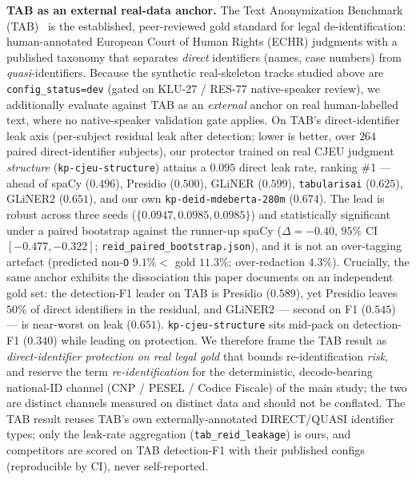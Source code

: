 \documentclass[11pt]{article}
\begin{document}
\textbf{TAB as an external real-data anchor.} The Text Anonymization Benchmark
(TAB)~\cite{pilan2022tab} is the established, peer-reviewed gold standard for legal de-identification:
human-annotated European Court of Human Rights (ECHR) judgments with a published taxonomy that
separates \emph{direct} identifiers (names, case numbers) from \emph{quasi}-identifiers. Because the
synthetic real-skeleton tracks studied above are \texttt{config\_status=dev} (gated on KLU-27 /
RES-77 native-speaker review), we additionally evaluate against TAB as an \emph{external} anchor on
real human-labelled text, where no native-speaker validation gate applies. On TAB's
direct-identifier leak axis (per-subject residual leak after detection; lower is better, over $264$
paired direct-identifier subjects), our protector trained on real CJEU judgment \emph{structure}
(\texttt{kp-cjeu-structure}) attains a $0.095$ direct leak rate, ranking \#1 --- ahead of spaCy
($0.496$), Presidio ($0.500$), GLiNER ($0.599$), \texttt{tabularisai} ($0.625$), GLiNER2 ($0.651$),
and our own \texttt{kp-deid-mdeberta-280m} ($0.674$). The lead is robust across three seeds
($\{0.0947, 0.0985, 0.0985\}$) and statistically significant under a paired bootstrap against the
runner-up spaCy ($\Delta = -0.40$, $95\%$ CI $[-0.477, -0.322]$;
\texttt{reid\_paired\_bootstrap.json}), and it is not an over-tagging artefact (predicted non-\texttt{O}
$9.1\% < $ gold $11.3\%$; over-redaction $4.3\%$). Crucially, the same anchor exhibits the
dissociation this paper documents on an independent gold set: the detection-F1 leader on TAB is
Presidio ($0.589$), yet Presidio leaves $50\%$ of direct identifiers in the residual, and GLiNER2 ---
second on F1 ($0.545$) --- is near-worst on leak ($0.651$). \texttt{kp-cjeu-structure} sits mid-pack
on detection-F1 ($0.340$) while leading on protection. We therefore frame the TAB result as
\emph{direct-identifier protection on real legal gold} that bounds re-identification \emph{risk}, and
reserve the term \emph{re-identification} for the deterministic, decode-bearing national-ID channel
(CNP / PESEL / Codice Fiscale) of the main study; the two are distinct channels measured on distinct
data and should not be conflated. The TAB result reuses TAB's own externally-annotated DIRECT/QUASI
identifier types; only the leak-rate aggregation (\texttt{tab\_reid\_leakage}) is ours, and
competitors are scored on TAB detection-F1 with their published configs (reproducible by CI), never
self-reported.
\end{document}
